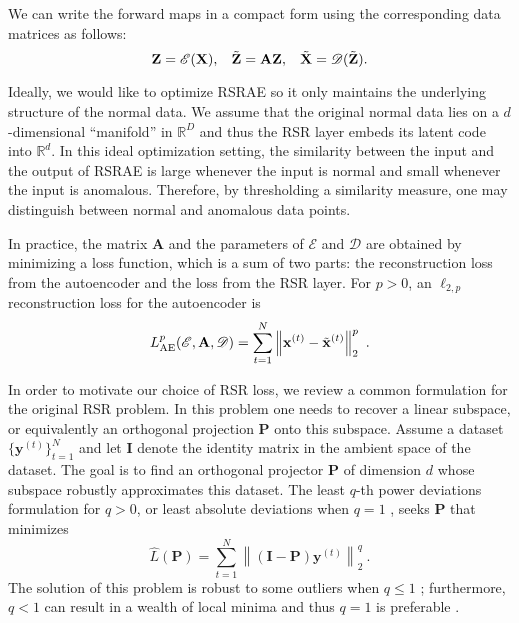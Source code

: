 \documentclass{article} \usepackage{iclr2020_conference,times}
\def\rvx{{\mathbf{x}}}
\def\rvy{{\mathbf{y}}}
\def\rmA{{\mathbf{A}}}
\def\rmI{{\mathbf{I}}}
\def\rmP{{\mathbf{P}}}
\def\rmX{{\mathbf{X}}}
\def\rmZ{{\mathbf{Z}}}
\newcommand{\R}{\mathbb{R}}
\newcommand{\norm}[1]{\left\lVert#1\right\rVert}
\begin{document}
We can write the forward maps in a compact form using the corresponding data matrices as follows:
\begin{equation}
    \rmZ = \mathscr{E}(\rmX), \hspace{0.3cm} \tilde{\rmZ} = \rmA \rmZ, \hspace{0.3cm} \tilde{\rmX} = \mathscr{D}(\tilde{\rmZ}).
\end{equation}

Ideally, we would like to optimize RSRAE so it only maintains the underlying structure of the normal data. We assume that the original normal data lies on a $d$-dimensional ``manifold'' in $\R^D$ and thus the RSR layer embeds its latent code into $\R^d$. In this ideal optimization setting, the similarity between the input and the output of RSRAE is large whenever the input is normal and small whenever the input is anomalous. Therefore, by thresholding a similarity measure,
one may distinguish between normal and anomalous data points.

In practice, the matrix $\rmA$ and the parameters of $\mathscr{E}$ and $\mathscr{D}$ are  obtained by minimizing a loss function, which is a sum of two parts: the reconstruction loss from the autoencoder and the loss from the RSR layer. For $p>0$, an $\ell_{2,p}$ reconstruction loss for the autoencoder is
\begin{equation}\label{eq:RSRAElossAE}
    L_{\rm{AE}}^p (\mathscr{E}, \rmA, \mathscr{D}) = \sum_{t=1}^N \norm{\rvx^{(t)} - \tilde{\rvx}^{(t)}}_2^p ~.
\end{equation}

In order to motivate our choice of RSR loss, we review a common formulation for the original RSR problem. In this problem one needs to recover a linear subspace, or equivalently an orthogonal projection $\rmP$ onto this subspace. Assume a dataset $\{\rvy^{(t)}\}_{t=1}^N$ and let $\rmI$ denote the identity matrix in the ambient space of the dataset. The goal is to find an orthogonal projector $\rmP$ of dimension $d$ whose subspace robustly approximates this dataset. The least $q$-th power deviations formulation for $q>0$, or least absolute deviations when $q=1$ \citep{lerman2018overview}, seeks $\rmP$ that minimizes \begin{equation}\label{eq:lossrsrorig}
    \hat{L}(\rmP) = \sum_{t=1}^N \norm{ \left( \rmI - \rmP \right) \rvy^{(t)}}_2^q ~.
\end{equation}
The solution of this problem is robust to some outliers when $q \leq 1$ \citep{lp_recovery_part1_11, lerman2017fast}; furthermore, $q<1$ can result in a wealth of local minima and thus $q=1$ is preferable \citep{lp_recovery_part1_11, lerman2017fast}.
\end{document}
